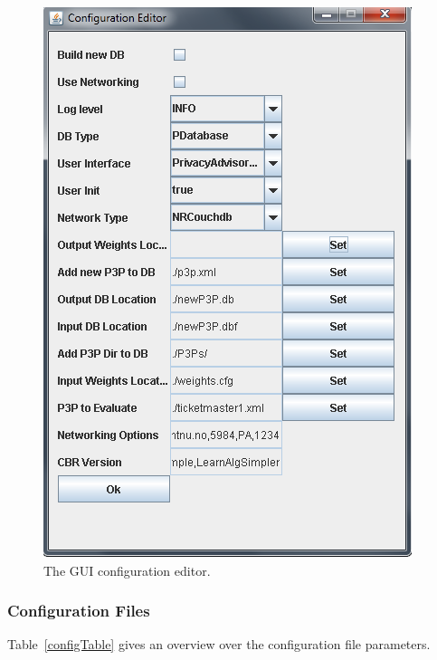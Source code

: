   \begin{figure}[h!]
     \includegraphics[width = .6\textwidth]{Documentation/gui_config.png}
     \caption{The GUI configuration editor.}
   \label{guiFigure}
 \end{figure}


\subsubsection{Configuration Files}

Table~\ref{configTable} gives an overview over the configuration file parameters.

